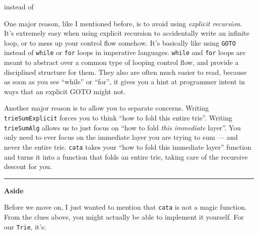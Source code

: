 \documentclass[]{article}
\newenvironment{Shaded}{}{}
\newcommand{\CommentTok}[1]{\textcolor[rgb]{0.38,0.63,0.69}{\textit{#1}}}
\newcommand{\DataTypeTok}[1]{\textcolor[rgb]{0.56,0.13,0.00}{#1}}
\newcommand{\DecValTok}[1]{\textcolor[rgb]{0.25,0.63,0.44}{#1}}
\newcommand{\FunctionTok}[1]{\textcolor[rgb]{0.02,0.16,0.49}{#1}}
\newcommand{\NormalTok}[1]{#1}
\newcommand{\OperatorTok}[1]{\textcolor[rgb]{0.40,0.40,0.40}{#1}}
\newcommand{\OtherTok}[1]{\textcolor[rgb]{0.00,0.44,0.13}{#1}}
\begin{document}
instead of

\begin{Shaded}
\end{Shaded}

One major reason, like I mentioned before, is to avoid using \emph{explicit
recursion}. It's extremely easy when using explicit recursion to accidentally
write an infinite loop, or to mess up your control flow somehow. It's basically
like using \texttt{GOTO} instead of \texttt{while} or \texttt{for} loops in
imperative languages. \texttt{while} and \texttt{for} loops are meant to
abstract over a common type of looping control flow, and provide a disciplined
structure for them. They also are often much easier to read, because as soon as
you see ``while'' or ``for'', it gives you a hint at programmer intent in ways
that an explicit GOTO might not.

Another major reason is to allow you to separate concerns. Writing
\texttt{trieSumExplicit} forces you to think ``how to fold this entire trie''.
Writing \texttt{trieSumAlg} allows us to just focus on ``how to fold \emph{this
immediate} layer''. You only need to ever focus on the immediate layer you are
trying to sum --- and never the entire trie. \texttt{cata} takes your ``how to
fold this immediate layer'' function and turns it into a function that folds an
entire trie, taking care of the recursive descent for you.

\begin{center}\rule{0.5\linewidth}{0.5pt}\end{center}

\textbf{Aside}

Before we move on, I just wanted to mention that \texttt{cata} is not a magic
function. From the clues above, you might actually be able to implement it
yourself. For our \texttt{Trie}, it's:
\end{document}
